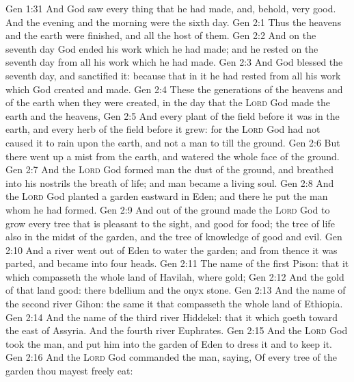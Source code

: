 \vs Gen 1:31 And God saw every thing that he had made, and, behold,  very good. And the evening and the morning were the sixth day.
\vs Gen 2:1 Thus the heavens and the earth were finished, and all the host of them.
\vs Gen 2:2 And on the seventh day God ended his work which he had made; and he rested on the seventh day from all his work which he had made.
\vs Gen 2:3 And God blessed the seventh day, and sanctified it: because that in it he had rested from all his work which God created and made.
\vs Gen 2:4 These  the generations of the heavens and of the earth when they were created, in the day that the \textsc{Lord} God made the earth and the heavens,
\vs Gen 2:5 And every plant of the field before it was in the earth, and every herb of the field before it grew: for the \textsc{Lord} God had not caused it to rain upon the earth, and  not a man to till the ground.
\vs Gen 2:6 But there went up a mist from the earth, and watered the whole face of the ground.
\vs Gen 2:7 And the \textsc{Lord} God formed man  the dust of the ground, and breathed into his nostrils the breath of life; and man became a living soul.
\vs Gen 2:8 And the \textsc{Lord} God planted a garden eastward in Eden; and there he put the man whom he had formed.
\vs Gen 2:9 And out of the ground made the \textsc{Lord} God to grow every tree that is pleasant to the sight, and good for food; the tree of life also in the midst of the garden, and the tree of knowledge of good and evil.
\vs Gen 2:10 And a river went out of Eden to water the garden; and from thence it was parted, and became into four heads.
\vs Gen 2:11 The name of the first  Pison: that  it which compasseth the whole land of Havilah, where  gold;
\vs Gen 2:12 And the gold of that land  good: there  bdellium and the onyx stone.
\vs Gen 2:13 And the name of the second river  Gihon: the same  it that compasseth the whole land of Ethiopia.
\vs Gen 2:14 And the name of the third river  Hiddekel: that  it which goeth toward the east of Assyria. And the fourth river  Euphrates.
\vs Gen 2:15 And the \textsc{Lord} God took the man, and put him into the garden of Eden to dress it and to keep it.
\vs Gen 2:16 And the \textsc{Lord} God commanded the man, saying, Of every tree of the garden thou mayest freely eat:
